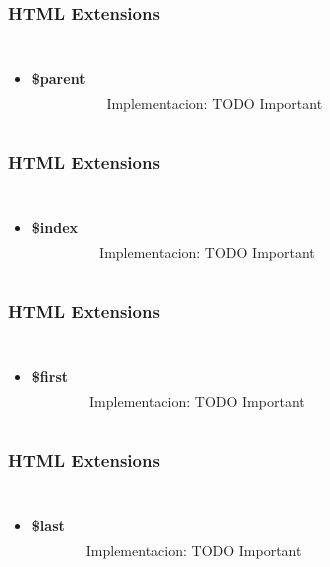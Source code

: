 \documentclass{beamer}
\begin{document}
\begin{frame}
\frametitle{HTML Extensions}
\begin{columns}[c]
\begin{itemize}
\item \textbf{\$parent}
\end{itemize}

\\~\\
Implementacion: TODO Important
\end{columns}
\end{frame}
\begin{frame}
\frametitle{HTML Extensions}
\begin{columns}[c]
\begin{itemize}
\item \textbf{\$index}
\end{itemize}

\\~\\
Implementacion: TODO Important
\end{columns}
\end{frame}
\begin{frame}
\frametitle{HTML Extensions}
\begin{columns}[c]
\begin{itemize}
\item \textbf{\$first}
\end{itemize}

\\~\\
Implementacion: TODO Important
\end{columns}
\end{frame}
\begin{frame}
\frametitle{HTML Extensions}
\begin{columns}[c]
\begin{itemize}
\item \textbf{\$last}
\end{itemize}

\\~\\
Implementacion: TODO Important
\end{columns}
\end{frame}
\end{document}
